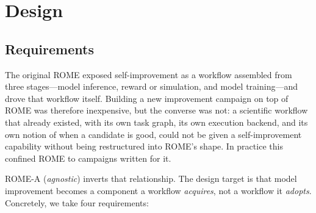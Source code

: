 %
%

\section{Design}
\label{sec:design}

\subsection{Requirements}
\label{sec:design:requirements}

The original ROME exposed self-improvement as a workflow assembled from three
stages---model inference, reward or simulation, and model training---and drove
that workflow itself. Building a new improvement campaign on top of ROME was
therefore inexpensive, but the converse was not: a scientific workflow that
already existed, with its own task graph, its own execution backend, and its own
notion of when a candidate is good, could not be given a self-improvement
capability without being restructured into ROME's shape. In practice this
confined ROME to campaigns written for it.

ROME-A (\emph{agnostic}) inverts that relationship. The design target is that
model improvement becomes a component a workflow \emph{acquires}, not a workflow
it \emph{adopts}. Concretely, we take four requirements:

